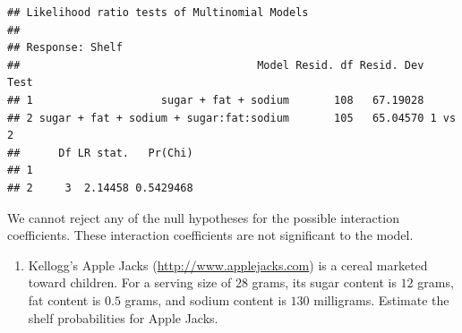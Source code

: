 \documentclass[11pt,]{article}
\newenvironment{Shaded}{\begin{snugshade}}{\end{snugshade}}
\newcommand{\KeywordTok}[1]{\textcolor[rgb]{0.13,0.29,0.53}{\textbf{#1}}}
\newcommand{\DataTypeTok}[1]{\textcolor[rgb]{0.13,0.29,0.53}{#1}}
\newcommand{\DecValTok}[1]{\textcolor[rgb]{0.00,0.00,0.81}{#1}}
\newcommand{\FloatTok}[1]{\textcolor[rgb]{0.00,0.00,0.81}{#1}}
\newcommand{\StringTok}[1]{\textcolor[rgb]{0.31,0.60,0.02}{#1}}
\newcommand{\CommentTok}[1]{\textcolor[rgb]{0.56,0.35,0.01}{\textit{#1}}}
\newcommand{\ControlFlowTok}[1]{\textcolor[rgb]{0.13,0.29,0.53}{\textbf{#1}}}
\newcommand{\OperatorTok}[1]{\textcolor[rgb]{0.81,0.36,0.00}{\textbf{#1}}}
\newcommand{\NormalTok}[1]{#1}
\providecommand{\tightlist}{%
  \setlength{\itemsep}{0pt}\setlength{\parskip}{0pt}}
\begin{document}
\begin{verbatim}
## Likelihood ratio tests of Multinomial Models
## 
## Response: Shelf
##                                     Model Resid. df Resid. Dev   Test
## 1                    sugar + fat + sodium       108   67.19028       
## 2 sugar + fat + sodium + sugar:fat:sodium       105   65.04570 1 vs 2
##      Df LR stat.   Pr(Chi)
## 1                         
## 2     3  2.14458 0.5429468
\end{verbatim}

We cannot reject any of the null hypotheses for the possible interaction
coefficients. These interaction coefficients are not significant to the
model.

\begin{enumerate}
\def\labelenumi{\alph{enumi}.}
\setcounter{enumi}{5}
\tightlist
\item
  Kellogg's Apple Jacks (\url{http://www.applejacks.com}) is a cereal
  marketed toward children. For a serving size of \(28\) grams, its
  sugar content is \(12\) grams, fat content is \(0.5\) grams, and
  sodium content is \(130\) milligrams. Estimate the shelf probabilities
  for Apple Jacks.
\end{enumerate}

\begin{Shaded}
\end{Shaded}
\end{document}
